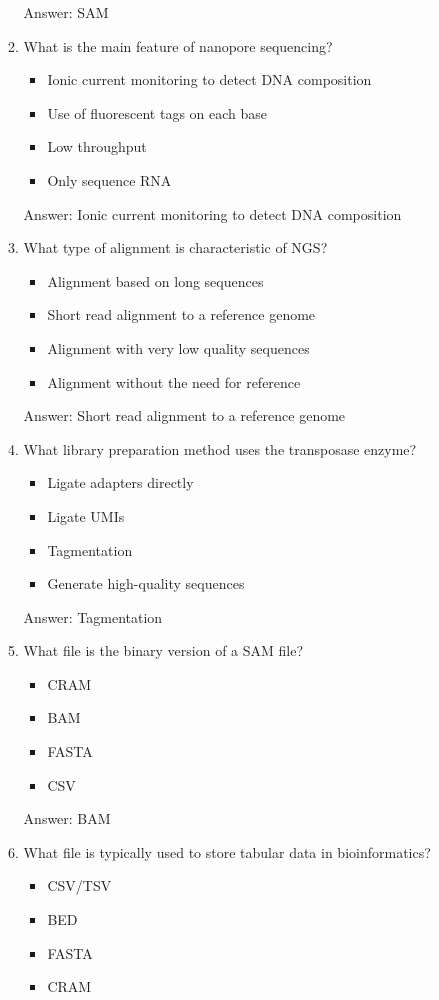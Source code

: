 \begin{itemize}
\begin{enumerate}
Answer: SAM

\item What is the main feature of nanopore sequencing?
\begin{itemize}
\item Ionic current monitoring to detect DNA composition
\item Use of fluorescent tags on each base
\item Low throughput
\item Only sequence RNA
\end{itemize}

Answer: Ionic current monitoring to detect DNA composition

\item What type of alignment is characteristic of NGS?
\begin{itemize}
\item Alignment based on long sequences
\item Short read alignment to a reference genome
\item Alignment with very low quality sequences
\item Alignment without the need for reference
\end{itemize}

Answer: Short read alignment to a reference genome

\item What library preparation method uses the transposase enzyme?
\begin{itemize}
\item Ligate adapters directly
\item Ligate UMIs
\item Tagmentation
\item Generate high-quality sequences
\end{itemize}

Answer: Tagmentation

\item What file is the binary version of a SAM file?
\begin{itemize}
\item CRAM
\item BAM
\item FASTA
\item CSV
\end{itemize}

Answer: BAM

\item What file is typically used to store tabular data in bioinformatics?
\begin{itemize}
\item CSV/TSV
\item BED
\item FASTA
\item CRAM
\end{itemize}


\end{enumerate}
\end{itemize}
